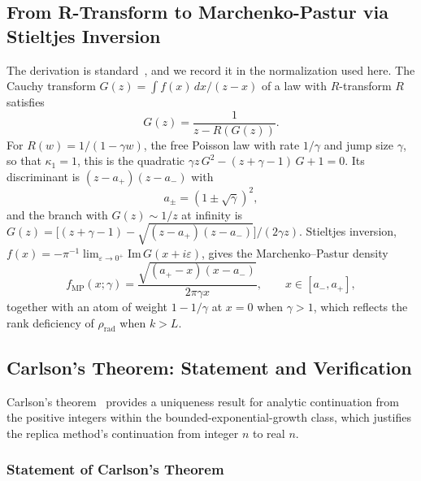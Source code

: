 \documentclass[11pt,letterpaper]{article}
\theoremstyle{plain}
\theoremstyle{definition}
\theoremstyle{remark}
\begin{document}
\subsection{From R-Transform to Marchenko-Pastur via Stieltjes Inversion}
\label{subsecB:stieltjes_inversion}
The derivation is standard~\citep{marchenkopastur1967, nicaspeicher2006}, and we record it in the normalization used here. The Cauchy transform $G(z) = \int f(x)\,dx/(z - x)$ of a law with $R$-transform $R$ satisfies
\begin{equation}
G(z) = \frac{1}{z - R(G(z))} .
\label{eqB:functional_relation}
\end{equation}
For $R(w) = 1/(1 - \gamma w)$, the free Poisson law with rate $1/\gamma$ and jump size $\gamma$, so that $\kappa_1 = 1$, this is the quadratic $\gamma z\,G^2 - (z + \gamma - 1)\,G + 1 = 0$. Its discriminant is $(z - a_+)(z - a_-)$ with
\begin{equation}
a_{\pm}=(1\pm\sqrt{\gamma})^2,
\label{eqB:endpoints}
\end{equation}
and the branch with $G(z) \sim 1/z$ at infinity is $G(z) = \big[(z + \gamma - 1) - \sqrt{(z - a_+)(z - a_-)}\big]/(2\gamma z)$. Stieltjes inversion, $f(x) = -\pi^{-1}\lim_{\varepsilon \to 0^+}\mathrm{Im}\,G(x + i\varepsilon)$, gives the Marchenko--Pastur density
\begin{equation}
f_{\mathrm{MP}}(x;\gamma)=\frac{\sqrt{(a_+-x)(x-a_-)}}{2\pi\gamma x}, \qquad x \in [a_-, a_+],
\label{eqB:mp_density_derived}
\end{equation}
together with an atom of weight $1 - 1/\gamma$ at $x = 0$ when $\gamma > 1$, which reflects the rank deficiency of $\rho_{\mathrm{rad}}$ when $k > L$.

\subsection{Carlson's Theorem: Statement and Verification}
\label{subsecB:carlson}

Carlson's theorem~\cite{carlson1914} provides a uniqueness result for analytic continuation from the positive integers within the bounded-exponential-growth class, which justifies the replica method's continuation from integer $n$ to real $n$.

\subsubsection*{Statement of Carlson's Theorem}
\end{document}
